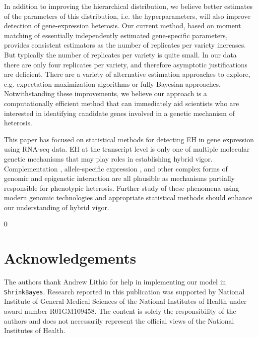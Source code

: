 \documentclass[useAMS,usenatbib,referee]{biom}
\newcommand{\blind}{0} %
\newcommand{\ShrinkBayes}{{\tt ShrinkBayes}}
\begin{document}
In addition to improving the hierarchical distribution, we believe better estimates of the parameters of this distribution, i.e. the hyperparameters, will also improve detection of gene-expression heterosis. Our current method, based on moment matching of essentially independently estimated gene-specific parameters, provides consistent estimators as the number of replicates per variety increases. But typically the number of replicates per variety is quite small. In our data there are only four replicates per variety, and therefore asymptotic justifications are deficient. There are a variety of alternative estimation approaches to explore, e.g. expectation-maximization algorithms or fully Bayesian approaches. Notwithstanding these improvements, we believe our approach is a computationally efficient method that can immediately aid scientists who are interested in identifying candidate genes involved in a genetic mechanism of heterosis. 

This paper has focused on statistical methods for detecting EH in gene expression using RNA-seq data.  EH at the transcript level is only one of multiple molecular genetic mechanisms that may play roles in establishing hybrid vigor.  Complementation \citep{paschold2012complementation}, allele-specific expression \citep{bell2013rna,wei2013computational}, and other complex forms of genomic and epigenetic interaction \citep{chen2013genomic} are all plausible as mechanisms partially responsible for phenotypic heterosis.  Further study of these phenomena using modern genomic technologies and appropriate statistical methods should enhance our understanding of hybrid vigor.



\backmatter %

\blind{
\section*{Acknowledgements}

The authors thank Andrew Lithio for help in implementing our model in \ShrinkBayes{}. Research reported in this publication was supported by National Institute of General Medical Sciences of the National Institutes of Health under award number R01GM109458. The content is solely the responsibility of the authors and does not necessarily represent the official views of the National Institutes of Health.
} \fi

\end{document}

